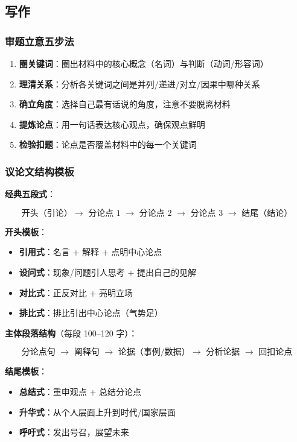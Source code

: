 \subsection{写作}

\subsubsection{审题立意五步法}

\begin{enumerate}
  \item \textbf{圈关键词}：圈出材料中的核心概念（名词）与判断（动词/形容词）
  \item \textbf{理清关系}：分析各关键词之间是并列/递进/对立/因果中哪种关系
  \item \textbf{确立角度}：选择自己最有话说的角度，注意不要脱离材料
  \item \textbf{提炼论点}：用一句话表达核心观点，确保观点鲜明
  \item \textbf{检验扣题}：论点是否覆盖材料中的每一个关键词
\end{enumerate}

\subsubsection{议论文结构模板}

\textbf{经典五段式}：

\[
\text{开头（引论）$\rightarrow$ 分论点 1 $\rightarrow$ 分论点 2 $\rightarrow$ 分论点 3 $\rightarrow$ 结尾（结论）}
\]

\textbf{开头模板}：
\begin{itemize}
  \item \textbf{引用式}：名言 + 解释 + 点明中心论点
  \item \textbf{设问式}：现象/问题引人思考 + 提出自己的见解
  \item \textbf{对比式}：正反对比 + 亮明立场
  \item \textbf{排比式}：排比引出中心论点（气势足）
\end{itemize}

\textbf{主体段落结构}（每段 100--120 字）：

\[
\text{分论点句 $\to$ 阐释句 $\to$ 论据（事例/数据）$\to$ 分析论据 $\to$ 回扣论点}
\]

\textbf{结尾模板}：
\begin{itemize}
  \item \textbf{总结式}：重申观点 + 总结分论点
  \item \textbf{升华式}：从个人层面上升到时代/国家层面
  \item \textbf{呼吁式}：发出号召，展望未来
\end{itemize}

